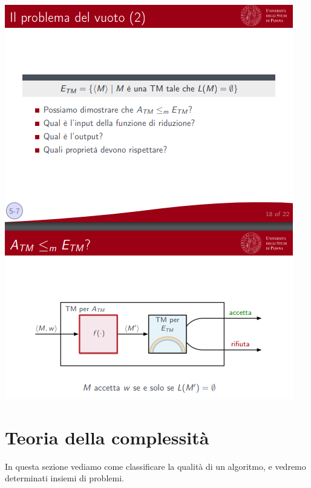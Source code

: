 \documentclass[]{article}
\begin{document}
\begin{center}
					\includegraphics[scale=0.8]{riducibile5.png}
				\end{center}
	\section{Teoria della complessità}
		In questa sezione vediamo come classificare la qualità di un algoritmo, e vedremo determinati insiemi di problemi.
\end{document}
